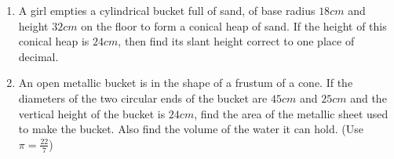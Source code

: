 \begin{enumerate}
\begin{figure}[H]
    \label{fig:Fig-3}
\end{figure}

\item A girl empties a cylindrical bucket full of sand, of base radius $18 cm$ and height $32 cm$ on the floor to form a conical heap of sand. If the height of this conical heap is $24 cm$, then find its slant height correct to one place of decimal.

\item An open metallic bucket is in the shape of a frustum of a cone. If the diameters of the two circular ends of the bucket are $45 cm$ and $25 cm$ and the vertical height of the bucket is $24 cm$, find the area of the metallic sheet used to make the bucket. Also find the volume of the water it can 
hold. (Use $\pi =\frac{22}{7}$)




\end{enumerate}
